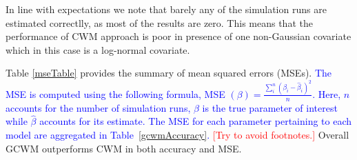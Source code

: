 \documentclass[11pt,letterpaper]{article}
\numberwithin{equation}{section}
\numberwithin{equation}{section}
\numberwithin{equation}{section}
\begin{document}
In line with expectations we note that barely any of the simulation runs are estimated correctlly, as most of the results are zero. This means that the performance of CWM approach is poor in presence of one non-Gaussian covariate which in this case is a log-normal covariate. 

Table \ref{mseTable} provides the summary of mean squared errors (MSEs). \textcolor{blue}{ The MSE is computed using the following formula, MSE $(\beta) = \frac{\sum_i^n (\beta_i - \hat\beta_i ) ^2}{n}$. Here, $n$ accounts for the number of simulation runs, $\beta$ is the true parameter of interest while $\hat{\beta}$ accounts for its estimate. The MSE for each parameter pertaining to each model are aggregated in Table~\ref{gcwmAccuracy}. }\textcolor{red}{[Try to avoid footnotes.]}  Overall GCWM outperforms CWM in both accuracy and MSE. 
\end{document}
